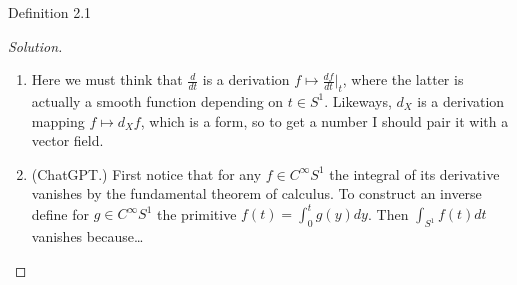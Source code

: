 \begin{thing3}{Definition 2.1}
\begin{proof}[Solution]
\begin{enumerate}
Now I realise: it's the cohomology of the vectors tangent to the fibers of the circle bundle! I think it's the kernel of the map induced by the projection \(\pi:X \times S^1 \to S^1\), namely
\[T_X(M)=\ker \pi_*=\{v \in TM: \pi_*(v)=0\in TS^1\}\]
So this will inject in the total bundle:
\[\begin{tikzcd}0\arrow[r]&T_X(M)\arrow[r]&T(X \times S^1)\arrow[r]&TS^1\arrow[r]&0\end{tikzcd}\]
Take Grassman algebra functor to get
\[\begin{tikzcd}0\arrow[r]&\Lambda^{^*}_X(M)\arrow[r]&\Lambda^{*}(X) \otimes \Lambda^{*}(S^1)\arrow[r]&\Lambda^{*}(S^1)\arrow[r]&0\end{tikzcd}\]
Giving the sequence
\[\begin{tikzcd}[column sep=small]
	\cdots\arrow[r]&0\arrow[r]&H^{0}_X(M)\arrow[r]&H^{0}(M) \cong H^{0}(X)\otimes \cancelto{\mathbb{R}}{H^{0}(S^1)} \cong H^{0}(X)\arrow[r]&H^{0}(S^1)=\mathbb{R}\arrow[r]&\leavevmode
\end{tikzcd}\]
\[\begin{tikzcd}[column sep=small]
	\leavevmode\arrow[r]&H^{1}_X(M)\arrow[r]&H^{1}(X)\arrow[r]&H^{1}(S^1)=\mathbb{R}\arrow[r]&H^{2}_X(M)\arrow[r]&0\arrow[r]&\cdots
\end{tikzcd}\]
So I wonder if the sequence
\[\begin{tikzcd}0\arrow[r]&H^{0}_X(M)\arrow[r]&H^{0}(X)\arrow[r]&\mathbb{R}\end{tikzcd}\]
gives
\[H^{0}_X(M)\cong H^{0}(X)\otimes C^\infty S^1\]
{\color{2}Looks like not.}

\textbf{Note.} Looks like using Serre spectral sequence (adding the hypothesis that \(X\) is simply connected yields \(H^0_X(M)\cong H^0(X) \otimes H^0(S^1)\). So the question of how the smooth functions \(C^\infty S^1\) appear remains a mystery.

\item Here we must think that \(\frac{d}{dt}\) is a derivation \(f \mapsto \frac{df}{dt}\Big|_{t}\), where the latter is actually a smooth function depending on \(t \in S^1\). Likeways, \(d_X\) is a derivation mapping \(f \mapsto d_Xf\), which is a form, so to get a number I should pair it with a vector field.

\item (ChatGPT.) First notice that for any \(f \in C^\infty S^1\) the integral of its derivative vanishes by the fundamental theorem of calculus. To construct an inverse define for \(g \in C^\infty S^1\) the primitive \(f(t)=\int_{0}^tg(y)dy\). Then \(\int_{S^1}f(t)dt\) {\color{4}vanishes because…}
\end{enumerate}
\end{proof}


\end{thing3}
